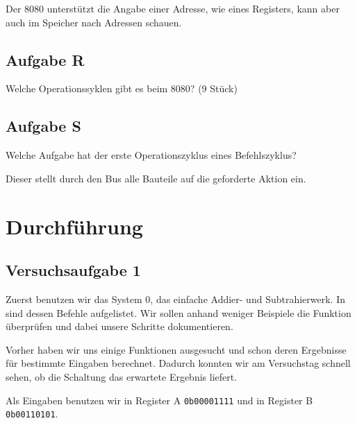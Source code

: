 Der 8080 unterstützt die Angabe einer Adresse, wie eines Registers, kann aber
auch im Speicher nach Adressen schauen.

\subsection{Aufgabe R}

\begin{problem}
	Welche Operationssyklen gibt es beim 8080? (9 Stück)
\end{problem}

\fehlt

\subsection{Aufgabe S}

\begin{problem}
	Welche Aufgabe hat der erste Operationszyklus eines Befehlszyklus?
\end{problem}

Dieser stellt durch den Bus alle Bauteile auf die geforderte Aktion ein.


\section{Durchführung}

\subsection{Versuchsaufgabe 1}

Zuerst benutzen wir das System 0, das einfache Addier- und Subtrahierwerk. In
\cite[Tabelle~8.1]{physik313-Anleitung} sind dessen Befehle aufgelistet. Wir
sollen anhand weniger Beispiele die Funktion überprüfen und dabei unsere
Schritte dokumentieren.

Vorher haben wir uns einige Funktionen ausgesucht und schon deren Ergebnisse
für bestimmte Eingaben berechnet. Dadurch konnten wir am Versuchstag schnell
sehen, ob die Schaltung das erwartete Ergebnis liefert.

Als Eingaben benutzen wir in Register A \texttt{0b00001111} und in Register B
\texttt{0b00110101}.

